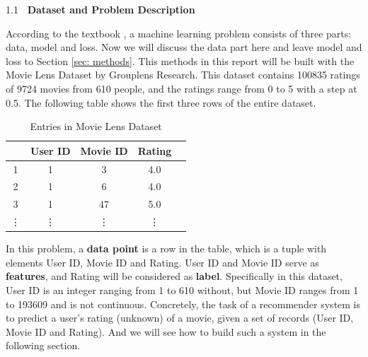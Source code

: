 \documentclass[a4paper,11pt]{article} %
\newcommand{\lineSpace}{1.1}
\newcounter{rSection}
\newcounter{rSubsection}[rSection]
\newenvironment{rSection}[1]{ %
\refstepcounter{rSection}
\begin{spacing}{\lineSpace}
  {\bf \large \therSection~#1 \hfill}  %
	\vspace{0.25em}

}{
\vspace{1em}
\end{spacing}
}
\newenvironment{rSubsection}[1]{ %
  \refstepcounter{rSubsection}
  \begin{spacing}{\lineSpace}
	{\bf\therSection.\therSubsection~#1}

  }{
\end{spacing}
\vspace{0.5em}
}
\begin{document}
\begin{rSection}{Dataset and Problem Description}
\label{sec: problem formulation}
According to the textbook \cite{MLBook}, a machine learning problem consists of three parts: data, model and loss.
Now we will discuss the data part here and leave model and loss to Section \ref{sec: methods}.
This methods in this report will be built with the Movie Lens Dataset \cite{MovieDataset} by Grouplens Research.
This dataset contains 100835 ratings of 9724 movies from 610 people, and the ratings range from 0 to 5 with a step at 0.5.
The following table shows the first three rows of the entire dataset.

\begin{table}[H]
	\centering
	\caption{Entries in Movie Lens Dataset}
	\begin{tabular}{c|cccc}
		\toprule
		& User ID & Movie ID & Rating  \\
		\midrule
		1 & 1 & 3& 4.0 \\
		2 & 1 & 6 &4.0\\
		3 & 1 & 47 & 5.0 \\
		\vdots & \vdots &\vdots &\vdots\\
		\bottomrule
	\end{tabular}
\end{table}

In this problem, a \textbf{data point} is a row in the table, which is a tuple with elements User ID, Movie ID and Rating.
User ID and Movie ID serve as \textbf{features}, and Rating will be considered as \textbf{label}.
Specifically in this dataset, User ID is an integer ranging from 1 to 610 without, but Movie ID ranges from 1 to 193609 and is not continuous.
Concretely, the task of a recommender system is to predict a user's rating (unknown) of a movie, given a set of records (User ID, Movie ID and Rating).
And we will see how to build such a system in the following section. 





\end{rSection}
\end{document}
